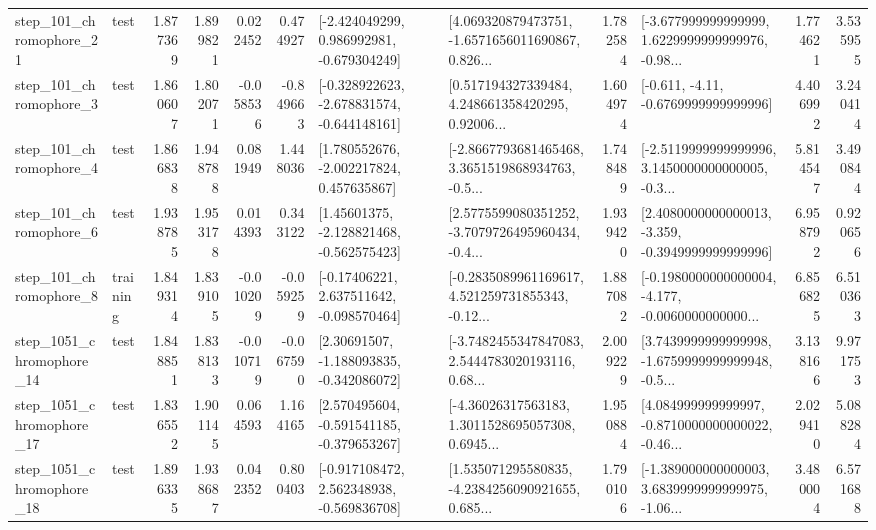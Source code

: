 \begin{tabular}{llrrrrllrlrr}
  step\_101\_chromophore\_21 &      test &      1.877369 &    1.899821 &      0.022452 &  0.474927 &   [-2.424049299, 0.986992981, -0.679304249] &  [4.069320879473751, -1.6571656011690867, 0.826... &       1.782584 &  [-3.677999999999999, 1.6229999999999976, -0.98... &            1.774621 &          3.535955 \\
   step\_101\_chromophore\_3 &      test &      1.860607 &    1.802071 &     -0.058536 & -0.849663 &  [-0.328922623, -2.678831574, -0.644148161] &  [0.517194327339484, 4.248661358420295, 0.92006... &       1.604974 &               [-0.611, -4.11, -0.6769999999999996] &            4.406992 &          3.240414 \\
   step\_101\_chromophore\_4 &      test &      1.866838 &    1.948788 &      0.081949 &  1.448036 &    [1.780552676, -2.002217824, 0.457635867] &  [-2.8667793681465468, 3.3651519868934763, -0.5... &       1.748489 &  [-2.5119999999999996, 3.1450000000000005, -0.3... &            5.814547 &          3.490844 \\
   step\_101\_chromophore\_6 &      test &      1.938785 &    1.953178 &      0.014393 &  0.343122 &    [1.45601375, -2.128821468, -0.562575423] &  [2.5775599080351252, -3.7079726495960434, -0.4... &       1.939420 &  [2.4080000000000013, -3.359, -0.3949999999999996] &            6.958792 &          0.920656 \\
   step\_101\_chromophore\_8 &  training &      1.849314 &    1.839105 &     -0.010209 & -0.059259 &    [-0.17406221, 2.637511642, -0.098570464] &  [-0.2835089961169617, 4.521259731855343, -0.12... &       1.887082 &  [-0.1980000000000004, -4.177, -0.0060000000000... &            6.856825 &          6.510363 \\
 step\_1051\_chromophore\_14 &      test &      1.848851 &    1.838133 &     -0.010719 & -0.067590 &    [2.30691507, -1.188093835, -0.342086072] &  [-3.7482455347847083, 2.5444783020193116, 0.68... &       2.009229 &  [3.7439999999999998, -1.6759999999999948, -0.5... &            3.138166 &          9.971753 \\
 step\_1051\_chromophore\_17 &      test &      1.836552 &    1.901145 &      0.064593 &  1.164165 &   [2.570495604, -0.591541185, -0.379653267] &  [-4.36026317563183, 1.3011528695057308, 0.6945... &       1.950884 &  [4.084999999999997, -0.8710000000000022, -0.46... &            2.029410 &          5.088284 \\
 step\_1051\_chromophore\_18 &      test &      1.896335 &    1.938687 &      0.042352 &  0.800403 &   [-0.917108472, 2.562348938, -0.569836708] &  [1.535071295580835, -4.2384256090921655, 0.685... &       1.790106 &  [-1.389000000000003, 3.6839999999999975, -1.06... &            3.480004 &          6.571688 \\

\end{tabular}
